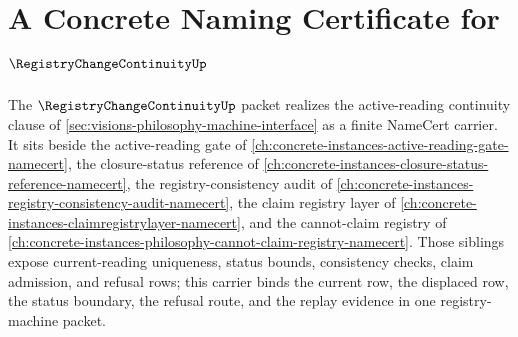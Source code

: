 \chapter{A Concrete Naming Certificate for $\RegistryChangeContinuityUp$}
\label{ch:concrete-instances-registry-change-continuity-namecert}

The $\RegistryChangeContinuityUp$ packet realizes the active-reading continuity clause of \autoref{sec:visions-philosophy-machine-interface} as a finite NameCert carrier. It sits beside the active-reading gate of \autoref{ch:concrete-instances-active-reading-gate-namecert}, the closure-status reference of \autoref{ch:concrete-instances-closure-status-reference-namecert}, the registry-consistency audit of \autoref{ch:concrete-instances-registry-consistency-audit-namecert}, the claim registry layer of \autoref{ch:concrete-instances-claimregistrylayer-namecert}, and the cannot-claim registry of \autoref{ch:concrete-instances-philosophy-cannot-claim-registry-namecert}. Those siblings expose current-reading uniqueness, status bounds, consistency checks, claim admission, and refusal rows; this carrier binds the current row, the displaced row, the status boundary, the refusal route, and the replay evidence in one registry-machine packet.

